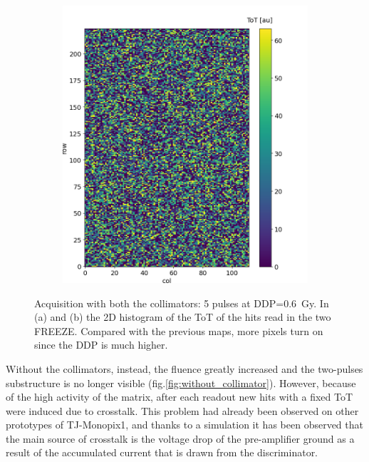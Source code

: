 \begin{figure}
\begin{subfigure}[b]{0.49\textwidth}
         \includegraphics[width=\linewidth]{figures/test_beam/tot_mapq2_15-57.png}  
         \caption{}
         \label{fig:aa2}
     \end{subfigure}
      \caption{Acquisition with both the collimators: 5 pulses at DDP=\SI{0.6}{Gy}. In (a) and (b) the 2D histogram of the ToT of the hits read in the two FREEZE. Compared with the previous maps, more pixels turn on since the DDP is much higher.}
      \label{fig:hit_map_full_matrix}
  \end{figure}

  Without the collimators, instead, the fluence greatly increased and the two-pulses substructure is no longer visible (fig.\ref{fig:without_collimator}). However, because of the high activity of the matrix, after each readout new hits with a fixed ToT were induced due to crosstalk.  
   This problem had already been observed on other prototypes of TJ-Monopix1, and thanks to a simulation it has been observed that the main source of crosstalk is the voltage drop of the pre-amplifier ground as a result of the accumulated current that is drawn from the discriminator.   
   
